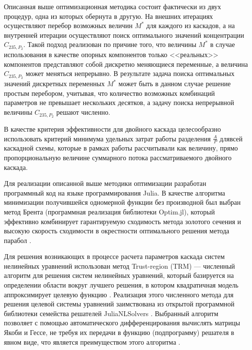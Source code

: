 
Описанная выше оптимизационная методика состоит фактически из двух процедур, одна из которых обернута в другую. На внешних итерациях осуществляют перебор возможных величин $M^{*}$ для каждого из каскадов, а на внутренней итерации осуществляют поиск оптимального значений концентрации $C_{235,{P_2}}$. Такой подход реализован по причине того, что величины $M^{*}$ в случае использования в качестве опорных компонентов только <<реальных>> компонентов представляют собой дискретно меняющиеся переменные, а величина $C_{235,{P_2}}$ может меняться непрерывно. В результате задача поиска оптимальных значений дискретных переменных $M^{*}$ может быть в данном случае решение простым перебором, учитывая, что количество возможных комбинаций параметров не превышает нескольких десятков, а задачу поиска непрерывной величины $C_{235,{P_2}}$ решают численно.

В качестве критерия эффективности для двойного каскада целесообразно использовать критерий минимума удельных затрат работы разделения $\frac{A}{P}$ длявсей каскадной схемы, которые в рамках работы рассчитывали как величину, прямо пропорциональную величине суммарного потока рассматриваемого двойного каскада.

Для реализации описанной выше методики оптимизации разработан программный код на языке программирования Julia. В качестве алгоритма минимизации получившейся одномерной функции без производной был выбран метод Брента (программная реализация библиотеки Optim.jl), который эффективно комбинирует гарантируемую сходимость метода золотого сечения и высокую скорость сходимости в окрестности оптимального решения метода парабол \cite{Brent_algorithm,mosk_lec,Optim.jl-2018}.

Для решения возникающих в процессе расчета параметров каскада систем нелинейных уравнений использован метод Trust-region (TRM) --- численный алгоритм для решения систем нелинейных уравнений, который базируется на определении области вокруг лучшего решения, в котором квадратичная модель аппроксимирует целевую функцию \cite{NumericalOptimization2006}. Реализация этого численного метода для решения целевой системы уравнений заимствована из открытой программной библиотеки семейства решателей JuliaNLSolvers \cite{mogensenJuliaNLSolversNLsolveJl2020}. Выбранный алгоритм позволяет с помощью автоматического дифференцирования вычислять матрицы Якоби и Гессе, не требуя их передачи в функцию (подпрограмму) решателя в явном виде, что является преимуществом этого алгоритма \cite{айда-задеБыстроеАвтоматическоеДифференцирование1989,revelsForwardModeAutomaticDifferentiation2016}.

